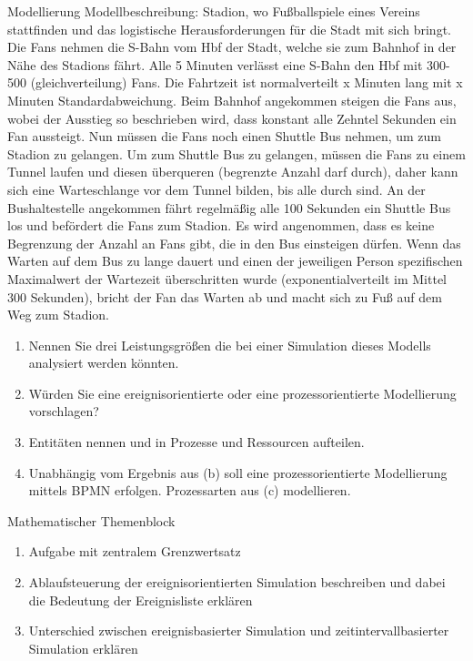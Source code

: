 \documentclass{article}
\begin{document}
\begin{exercise}{Modellierung}
  Modellbeschreibung: Stadion, wo Fußballspiele eines Vereins stattfinden und das logistische Herausforderungen für die Stadt mit sich bringt. Die Fans nehmen die S-Bahn vom Hbf der Stadt, welche sie zum Bahnhof in der Nähe des Stadions fährt. Alle 5 Minuten verlässt eine S-Bahn den Hbf mit 300-500 (gleichverteilung) Fans. Die Fahrtzeit ist normalverteilt x Minuten lang mit x Minuten Standardabweichung. Beim Bahnhof angekommen steigen die Fans aus, wobei der Ausstieg so beschrieben wird, dass konstant alle Zehntel Sekunden ein Fan aussteigt. Nun müssen die Fans noch einen Shuttle Bus nehmen, um zum Stadion zu gelangen. Um zum Shuttle Bus zu gelangen, müssen die Fans zu einem Tunnel laufen und diesen überqueren (begrenzte Anzahl darf durch), daher kann sich eine Warteschlange vor dem Tunnel bilden, bis alle durch sind. An der Bushaltestelle angekommen fährt regelmäßig alle 100 Sekunden ein Shuttle Bus los und befördert die Fans zum Stadion. Es wird angenommen, dass es keine Begrenzung der Anzahl an Fans gibt, die in den Bus einsteigen dürfen. Wenn das Warten auf dem Bus zu lange dauert und einen der jeweiligen Person spezifischen Maximalwert der Wartezeit überschritten wurde (exponentialverteilt im Mittel 300 Sekunden), bricht der Fan das Warten ab und macht sich zu Fuß auf dem Weg zum Stadion.
  \begin{enumerate}
    \item Nennen Sie drei Leistungsgrößen die bei einer Simulation dieses Modells analysiert werden könnten.
    \item Würden Sie eine ereignisorientierte oder eine prozessorientierte Modellierung vorschlagen?
    \item Entitäten nennen und in Prozesse und Ressourcen aufteilen.
    \item Unabhängig vom Ergebnis aus (b) soll eine prozessorientierte Modellierung mittels BPMN erfolgen. Prozessarten aus (c) modellieren.
  \end{enumerate}
\end{exercise}

\begin{exercise}{Mathematischer Themenblock}
  \begin{enumerate}
    \item Aufgabe mit zentralem Grenzwertsatz
    \item Ablaufsteuerung der ereignisorientierten Simulation beschreiben und dabei die Bedeutung der Ereignisliste erklären
    \item Unterschied zwischen ereignisbasierter Simulation und zeitintervallbasierter Simulation erklären
  \end{enumerate}
\end{exercise}
\end{document}
